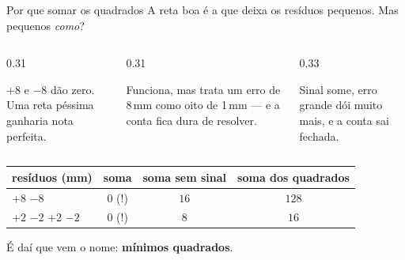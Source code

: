 \documentclass[aspectratio=169,11pt]{beamer}
\newcommand{\bnum}[1]{\textbf{\textcolor{mTeal}{#1}}}
\begin{document}
\begin{frame}{Por que somar os quadrados}
  A reta boa é a que deixa os resíduos pequenos. Mas pequenos \emph{como}?
  \medskip
  \begin{columns}[T]
    \begin{column}{0.31\textwidth}
      \begin{armadilha}[title={Somar os resíduos}]
        \small $+8$ e $-8$ dão zero. Uma reta péssima ganharia nota perfeita.
      \end{armadilha}
    \end{column}
    \begin{column}{0.31\textwidth}
      \begin{cuidado}[title={Somar sem sinal}]
        \small Funciona, mas trata um erro de 8\,mm como oito de 1\,mm --- e a conta
        fica dura de resolver.
      \end{cuidado}
    \end{column}
    \begin{column}{0.33\textwidth}
      \begin{ideia}[title={Somar os quadrados}]
        \small Sinal some, \alert{erro grande dói muito mais}, e a conta sai fechada.
      \end{ideia}
    \end{column}
  \end{columns}
  \bigskip
  \centering
  \small
  \renewcommand{\arraystretch}{1.1}
  \begin{tabular}{lccc}
    \toprule
    resíduos (mm) & soma & soma sem sinal & \textcolor{mTeal}{soma dos quadrados} \\
    \midrule
    $+8$ \; $-8$ & $0$ \;\textcolor{mRose}{(!)} & $16$ & \textcolor{mTeal}{$128$} \\
    $+2$ \; $-2$ \; $+2$ \; $-2$ & $0$ \;\textcolor{mRose}{(!)} & $8$ & \textcolor{mTeal}{$16$} \\
    \bottomrule
  \end{tabular}
  \medskip

  É daí que vem o nome: \bnum{mínimos quadrados}.
\end{frame}
\end{document}
